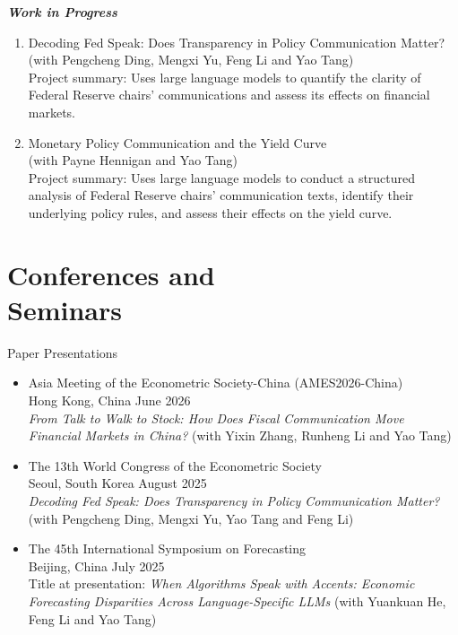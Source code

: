 \documentclass[margin]{res}
\begin{document}
\begin{resume}
\textbf{\textit{Work in Progress}}
\begin{enumerate}
  \item Decoding Fed Speak: Does Transparency in Policy Communication Matter?\\
  (with Pengcheng Ding, Mengxi Yu, Feng Li and Yao Tang)\\
  Project summary: Uses large language models to quantify the clarity of Federal Reserve chairs' communications and assess its effects on financial markets.

  \item Monetary Policy Communication and the Yield Curve\\
  (with Payne Hennigan and Yao Tang)\\
  Project summary: Uses large language models to conduct a structured analysis of Federal Reserve chairs' communication texts, identify their underlying policy rules, and assess their effects on the yield curve.
\end{enumerate}

\section{Conferences and\\Seminars}
Paper Presentations
\begin{itemize} \itemsep -2pt
  \item Asia Meeting of the Econometric Society-China (AMES2026-China)\\
  Hong Kong, China \hfill June 2026\\
  \emph{From Talk to Walk to Stock: How Does Fiscal Communication Move Financial Markets in China?} (with Yixin Zhang, Runheng Li and Yao Tang)

  \item The 13th World Congress of the Econometric Society\\
  Seoul, South Korea \hfill August 2025\\
  \emph{Decoding Fed Speak: Does Transparency in Policy Communication Matter?} (with Pengcheng Ding, Mengxi Yu, Yao Tang and Feng Li)

  \item The 45th International Symposium on Forecasting\\
  Beijing, China \hfill July 2025\\
  Title at presentation: \emph{When Algorithms Speak with Accents: Economic Forecasting Disparities Across Language-Specific LLMs} (with Yuankuan He, Feng Li and Yao Tang)


\end{itemize}
\end{resume}
\end{document}
